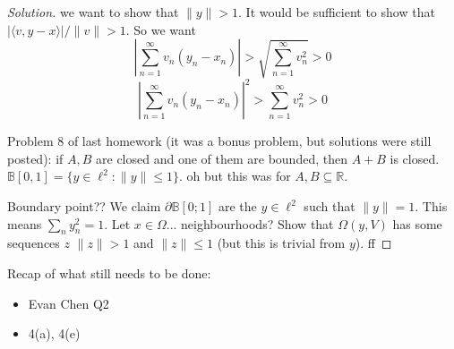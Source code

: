 \documentclass{article}
\newcommand{\R}{{\mathbb R}}
\begin{document}
\begin{enumerate}
\begin{proof}[Solution]
		we want to show that $\lVert y \rVert > 1$.
		It would be sufficient to show that $|\langle v, y-x \rangle|/\lVert v \rVert > 1$.
		So we want
		\[
			\left\lvert\sum_{n=1}^\infty v_n(y_n-x_n) \right\rvert
			 > \sqrt{\sum_{n=1}^\infty v^2_n} > 0
		\]
		\[
			\left\lvert\sum_{n=1}^\infty v_n(y_n-x_n) \right\rvert^2
			 > \sum_{n=1}^\infty v^2_n > 0
		\]


		Problem 8 of last homework
		(it was a bonus problem, but solutions were still posted):
		if $A,B$ are closed and one of them are bounded, then $A + B$ is closed.
		$\mathbb{B}[0,1] = \{y \in \ell^2 \colon \lVert y \rVert \leq 1\}$.
		oh but this was for $A,B \subseteq \R$.

		Boundary point??
		We claim $\partial \mathbb{B}[0;1]$ are the $y \in \ell^2$
		such that $\lVert y \rVert = 1$.
		This means $\sum_n y_n^2 = 1$.
		Let $x \in \Omega$... neighbourhoods?
		Show that $\Omega(y,V)$ has some sequences $z$ $\lVert z \rVert > 1$
		and $\lVert z \rVert \leq 1$ (but this is trivial from $y$).
		ff
	\end{proof}
\end{enumerate}
Recap of what still needs to be done:
	\begin{itemize}
		\item Evan Chen Q2
		\item 4(a), 4(e)
	\end{itemize}
\clearpage
\end{document}
